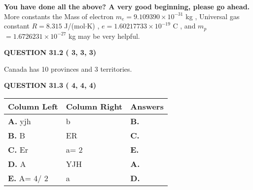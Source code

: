 \documentclass[12pt]{article}
\begin{document}
   
   
\vspace{0.3in}
{\textbf{\LARGE{You have done all the above? A very good beginning, please go ahead.}}}
More constants the
Mass of electron
$m_e$$ =
9.109390 \times 10^{-31} $
kg
,
Universal gas constant
$R$$ =
8.315 $
J/(mol$\cdot $K)
,
$e$$ =
1.60217733 \times 10^{-19} $
C
, and
$m_p$$ =
1.6726231 \times 10^{-27} $
kg
%
may be very helpful.
\vspace{0.3in}
   
   
  
\vspace{0.2in}
  
{\textbf{\Large{QUESTION
31.2 
 (          3,          3,          3)
}}}
  
  
 
 
\noindent{}
 
 
Canada has  %
10 provinces and  %
3 territories.
 
 
 
 
  
\vspace{0.2in}
  
{\textbf{\Large{QUESTION
31.3 
 (          4,          4,          4)
}}}
  
  
 
 
\noindent{}
  
  
\begin{tabular}{|l|l|l|}
 \hline
 Column Left & Column Right  & Answers       \\ 
 \hline
{\textbf{\large{
A.}}}
yjh
  & 
b
 & 
{\textbf{\large{
B.}}}
 \\ 
 \hline
{\textbf{\large{
B.}}}
B
  & 
ER
 & 
{\textbf{\large{
C.}}}
 \\ 
 \hline
{\textbf{\large{
C.}}}
Er
  & 
 a= %
2
 & 
{\textbf{\large{
E.}}}
 \\ 
 \hline
{\textbf{\large{
D.}}}
A
  & 
YJH
 & 
{\textbf{\large{
A.}}}
 \\ 
 \hline
{\textbf{\large{
E.}}}
 A= %
4/ %
2

  & 
a
 & 
{\textbf{\large{
D.}}}
 \\ 
 \hline
 \end{tabular}
  
  
 
 
 
 
  
\end{document}
